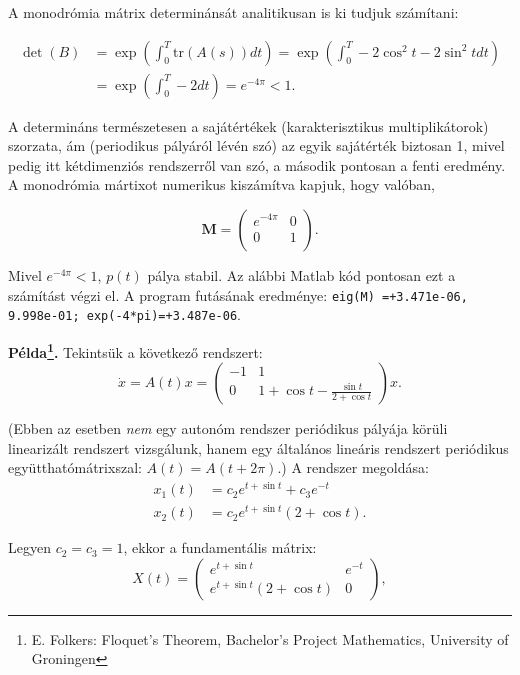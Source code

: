 A monodrómia mátrix determinánsát analitikusan is ki tudjuk számítani:

\begin{align}
\det(B)&=\exp \left( \int_0^T \mathrm{tr}(A(s)) dt\right)=\exp \left( \int_0^T -2\cos^2t-2\sin^2t dt\right)\\
&=\exp \left( \int_0^T -2 dt\right)=e^{-4\pi}<1.
\end{align}

A determináns természetesen a sajátértékek (karakterisztikus multiplikátorok) szorzata, ám (periodikus pályáról lévén szó) az egyik sajátérték biztosan 1, mivel pedig itt kétdimenziós rendszerről van szó, a második pontosan a fenti eredmény. A monodrómia mártixot numerikus kiszámítva kapjuk, hogy valóban,

\begin{equation}
\mathbf{M}=\begin{pmatrix}
e^{-4\pi} & 0\\ 0 & 1\\
\end{pmatrix}.
\end{equation}

Mivel $e^{-4\pi}<1$, $p(t)$ pálya stabil. Az alábbi Matlab kód pontosan ezt a számítást végzi el. A program futásának eredménye: {\tt eig(M)    =+3.471e-06, 9.998e-01; exp(-4*pi)=+3.487e-06}.



\textbf{Példa\footnote{E. Folkers: Floquet’s Theorem, Bachelor’s Project Mathematics, University of Groningen}.} Tekintsük a következő rendszert:
%
\begin{equation}
\dot{x}=A(t)x=\begin{pmatrix}
-1 & 1\\
0 & 1+ \cos t-\frac{\sin t}{2+\cos t}
\end{pmatrix}x.
\end{equation}

(Ebben az esetben \emph{nem} egy autonóm rendszer periódikus pályája körüli linearizált rendszert vizsgálunk, hanem egy általános lineáris rendszert periódikus együtthatómátrixszal: $A(t)=A(t+2\pi)$.) A rendszer megoldása:
%
\begin{align}
x_1(t)&=c_2 e^{t+\sin t}+c_3 e^{-t}\\
x_2(t)&=c_2e^{t+\sin t}\left( 2+\cos t\right).
\end{align}

Legyen $c_2=c_3=1$, ekkor a fundamentális mátrix:
%
\begin{equation}
X(t)=
\begin{pmatrix}
e^{t+\sin t} &  e^{-t}\\
e^{t+\sin t}\left( 2+\cos t\right) &0
\end{pmatrix},
\end{equation}


